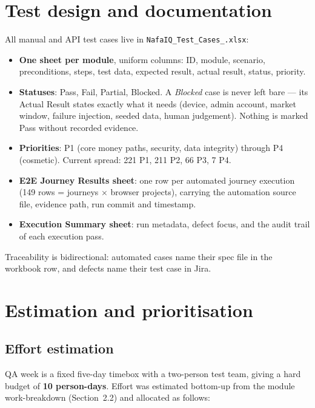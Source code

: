 \documentclass[11pt,a4paper]{article}
\begin{document}
\section{Test design and documentation}

All manual and API test cases live in \texttt{NafaIQ\_Test\_Cases\_.xlsx}:

\begin{itemize}
  \item \textbf{One sheet per module}, uniform columns: ID, module, scenario,
        preconditions, steps, test data, expected result, actual result,
        status, priority.
  \item \textbf{Statuses}: Pass, Fail, Partial, Blocked. A \emph{Blocked} case is
        never left bare --- its Actual Result states exactly what it needs
        (device, admin account, market window, failure injection, seeded data,
        human judgement). Nothing is marked Pass without recorded evidence.
  \item \textbf{Priorities}: P1 (core money paths, security, data integrity) through
        P4 (cosmetic). Current spread: 221 P1, 211 P2, 66 P3, 7 P4.
  \item \textbf{E2E Journey Results sheet}: one row per automated journey execution
        (149 rows = journeys $\times$ browser projects), carrying the automation
        source file, evidence path, run commit and timestamp.
  \item \textbf{Execution Summary sheet}: run metadata, defect focus, and the
        audit trail of each execution pass.
\end{itemize}

Traceability is bidirectional: automated cases name their spec file in the
workbook row, and defects name their test case in Jira.

\section{Estimation and prioritisation}\label{sec:estimation}

\subsection{Effort estimation}
QA week is a fixed five-day timebox with a two-person test team, giving a hard
budget of \textbf{10 person-days}. Effort was estimated bottom-up from the
module work-breakdown (Section~2.2) and allocated as follows:
\end{document}
